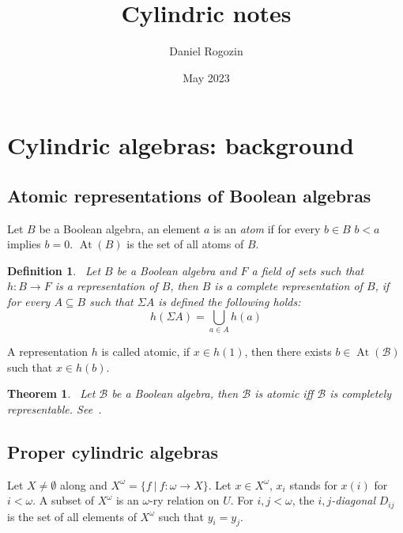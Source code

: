 \documentclass{article}
\title{Cylindric notes}
\author{Daniel Rogozin}
\date{May 2023}
\theoremstyle{defin}
\newtheorem{definition}{Definition}
\theoremstyle{theorem}
\newtheorem{theorem}{Theorem}
\theoremstyle{claim}
\theoremstyle{prop}
\theoremstyle{lemma}
\theoremstyle{fact}
\theoremstyle{remark}
\theoremstyle{ex}
\theoremstyle{col}
\theoremstyle{question}
\begin{document}
\maketitle

\nocite{*}




\section{Cylindric algebras: background}

\subsection{Atomic representations of Boolean algebras}

Let $B$ be a Boolean algebra, an element $a$ is an \emph{atom} if for every $b \in B$
$b < a$ implies $b = 0$. $\operatorname{At}(B)$ is the set of all atoms
of $B$.

\begin{definition}~\label{compeleterep}
Let $B$ be a Boolean algebra and $F$ a field of sets such that $h : B \to F$ is a
representation of $B$, then $B$ is a complete representation of $B$, if for every
$A \subseteq B$ such that $\Sigma A$ is defined the following holds:
\begin{equation}
  h(\Sigma A) = \bigcup \limits_{a \in A} h(a)
\end{equation}
\end{definition}

A representation $h$ is called atomic, if $x \in h(1)$, then there exists 
$b \in \operatorname{At}(\mathcal{B})$ such that $x \in h(b)$.

\begin{theorem}~\label{completeboolean}
  Let $\mathcal{B}$ be a Boolean algebra, then $\mathcal{B}$ is atomic iff 
  $\mathcal{B}$ is completely representable. See~\cite[Corollary 6]{hirsch1997complete}.
\end{theorem}

\subsection{Proper cylindric algebras}

Let $X \neq \emptyset$ along and $X^{\omega} = \{ f \: | \: f : \omega \to X \}$.
Let $x \in X^{\omega}$, $x_i$ stands for $x(i)$ for $i < \omega$. 
A subset of $X^{\omega}$ is an $\omega$-ry relation on $U$. 
For $i, j < \omega$, the \emph{$i,j$-diagonal} $D_{ij}$ is the set of all elements of $X^{\omega}$ 
such that $y_i = y_j$.
\end{document}
